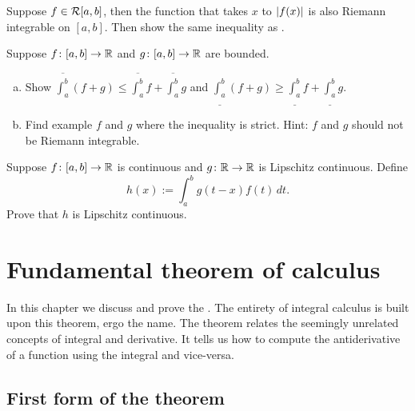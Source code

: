 \begin{exercise}[Challenging] \label{exercise:hardabsint}
Suppose $f \in {\mathcal{R}}[a,b]$, then the function that takes $x$ to
$\left\lvert {f(x)} \right\rvert$ is also Riemann integrable on $[a,b]$.
Then show the same inequality as .
\end{exercise}

\begin{exercise}  \label{exercise:upperlowerlinineq}
Suppose $f \colon [a,b] \to {\mathbb{R}}$ and $g \colon [a,b] \to {\mathbb{R}}$
are bounded.
\begin{enumerate}[a)]
\item
Show
$\overline{\int_a^b} (f+g) \leq \overline{\int_a^b}f+\overline{\int_a^b}g$ and
$\underline{\int_a^b} (f+g) \geq
\underline{\int_a^b}f+\underline{\int_a^b}g$.
\item
Find example $f$ and $g$ where
the inequality is strict.  Hint: $f$ and $g$ should not be Riemann
integrable.
\end{enumerate}
\end{exercise}

\begin{exercise}
Suppose $f \colon [a,b] \to {\mathbb{R}}$ is continuous and $g \colon {\mathbb{R}} \to {\mathbb{R}}$ is
Lipschitz continuous.  Define
\begin{equation*}
h(x) := \int_a^b g(t-x) f(t) \, dt .
\end{equation*}
Prove that $h$ is Lipschitz continuous.
\end{exercise}


\sectionnewpage
\section{Fundamental theorem of calculus}
\label{sec:ftc}


In this chapter we discuss and prove the
\emph{}.
The entirety of integral calculus is built upon this theorem,
ergo the name.
The theorem relates the seemingly unrelated concepts of integral and
derivative.  It tells us how to compute the antiderivative of a function
using the integral and vice-versa.

\subsection{First form of the theorem}

